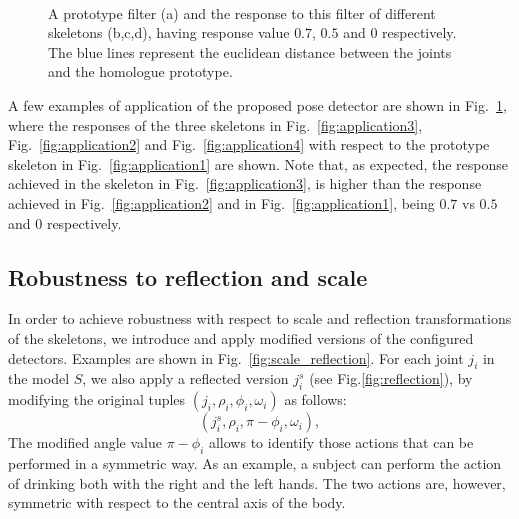 \documentclass[runningheads,a4paper]{llncs}
\begin{document}
\begin{figure}[!t]
   \centering
          \setlength{\unitlength}{50mm}%
~
~
~
   \caption{A prototype filter (a) and the response to this filter of different skeletons (b,c,d), having response value $0.7$, $0.5$ and $0$ respectively. The blue lines represent the euclidean distance between the joints and the homologue prototype.}
   \label{fig:filter_application}
\end{figure}




A few examples of application of the proposed pose detector are shown in Fig.~\ref{fig:filter_application}, where the responses of the three skeletons in Fig.~\ref{fig:application3}, Fig.~\ref{fig:application2} and Fig.~\ref{fig:application4} with respect to the prototype skeleton in Fig.~\ref{fig:application1} are shown. Note that, as expected, the response achieved in the skeleton in Fig.~\ref{fig:application3}, is higher than the response achieved in Fig.~\ref{fig:application2} and in Fig.~\ref{fig:application1}, being $0.7$ vs $0.5$ and $0$ respectively.


\subsection{Robustness to reflection and scale}
In order to achieve robustness with respect to scale and reflection transformations of the skeletons, we introduce and apply modified versions of the configured detectors. Examples are shown in Fig.~\ref{fig:scale_reflection}. 
For each joint $j_i$ in the model $S$, we also apply a reflected version $j_i^s$ (see Fig.\ref{fig:reflection}), by modifying the original tuples $(j_i, \rho_i, \phi_i, \omega_{i})$ as follows: 
\begin{equation}
(j_i^s, \rho_i, \pi - \phi_i, \omega_i),
\end{equation}
The modified angle value $\pi - \phi_i$ allows to identify those actions that can be performed in a symmetric way. As an example, a subject can perform the action of drinking both with the right and the left hands. The two actions are, however, symmetric with respect to the central axis of the body.
\end{document}
